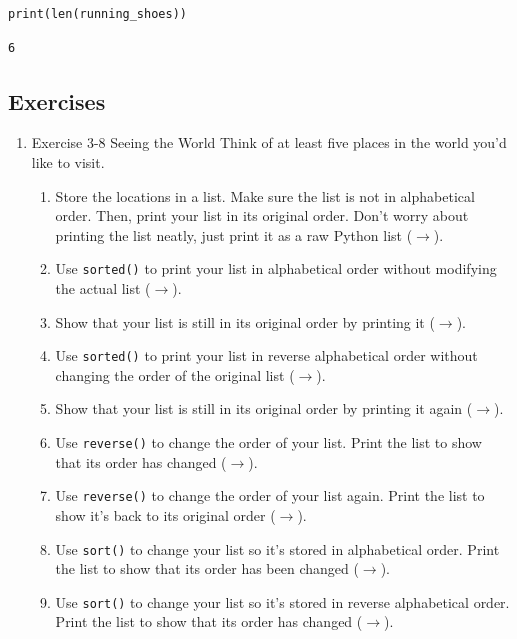 \documentclass[10pt]{book}
\begin{document}
\label{orgab754df}
\begin{verbatim}
print(len(running_shoes))
\end{verbatim}

\label{org5b1bca2}
\begin{verbatim}
6
\end{verbatim}
\subsection{Exercises}
\label{sec:orgca11422}
\begin{enumerate}
\item Exercise 3-8 Seeing the World
\label{sec:orge5f6a28}
Think of at least five places in the world you’d like to visit.

\begin{enumerate}
\item Store the locations in a list. Make sure the list is not in alphabetical order.  Then, print your list in its original order. Don’t worry about printing the list neatly, just print it as a raw Python list (\hyperref[org1a9df74]{\(\rightarrow\)}).
\item Use \texttt{sorted()} to print your list in alphabetical order without modifying the actual list (\hyperref[org4cc1f20]{\(\rightarrow\)}).
\item Show that your list is still in its original order by printing it  (\hyperref[orgd47260f]{\(\rightarrow\)}).
\item Use \texttt{sorted()} to print your list in reverse alphabetical order without changing the order of the original list (\hyperref[orgc6344b4]{\(\rightarrow\)}).
\item Show that your list is still in its original order by printing it again (\hyperref[org7a12a4d]{\(\rightarrow\)}).
\item Use \texttt{reverse()} to change the order of your list. Print the list to show that its order has changed (\hyperref[org76bd2f9]{\(\rightarrow\)}).
\item Use \texttt{reverse()} to change the order of your list again. Print the list to show it’s back to its original order (\hyperref[org7dae843]{\(\rightarrow\)}).
\item Use \texttt{sort()} to change your list so it’s stored in alphabetical order. Print the list to show that its order has been changed (\hyperref[org0ab3fb5]{\(\rightarrow\)}).
\item Use \texttt{sort()} to change your list so it’s stored in reverse alphabetical order. Print the list to show that its order has changed  (\hyperref[org7201b8b]{\(\rightarrow\)}).
\end{enumerate}


\end{enumerate}
\end{document}
